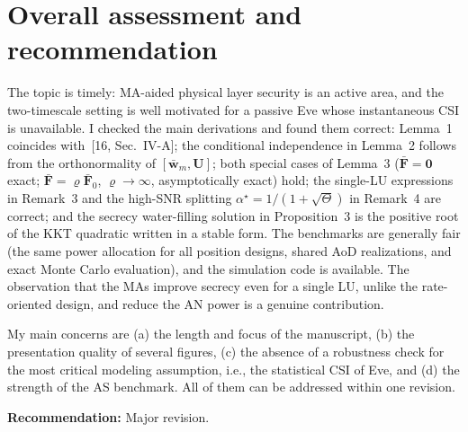 \documentclass[10pt,a4paper]{article}
\begin{document}
\section{Overall assessment and recommendation}
The topic is timely: MA-aided physical layer security is an active area, and the two-timescale setting is well motivated for a passive Eve whose instantaneous CSI is unavailable. I checked the main derivations and found them correct: Lemma~1 coincides with~[16, Sec.~IV-A]; the conditional independence in Lemma~2 follows from the orthonormality of $[\bar{\mathbf w}_m,\mathbf U]$; both special cases of Lemma~3 ($\bar{\mathbf F}=\mathbf 0$ exact; $\bar{\mathbf F}=\varrho\bar{\mathbf F}_0$, $\varrho\to\infty$, asymptotically exact) hold; the single-LU expressions in Remark~3 and the high-SNR splitting $\alpha^\star=1/(1+\sqrt\Theta)$ in Remark~4 are correct; and the secrecy water-filling solution in Proposition~3 is the positive root of the KKT quadratic written in a stable form. The benchmarks are generally fair (the same power allocation for all position designs, shared AoD realizations, and exact Monte Carlo evaluation), and the simulation code is available. The observation that the MAs improve secrecy even for a single LU, unlike the rate-oriented design, and reduce the AN power is a genuine contribution.

My main concerns are (a) the length and focus of the manuscript, (b) the presentation quality of several figures, (c) the absence of a robustness check for the most critical modeling assumption, i.e., the statistical CSI of Eve, and (d) the strength of the AS benchmark. All of them can be addressed within one revision.

\noindent\textbf{Recommendation:} Major revision.
\end{document}
